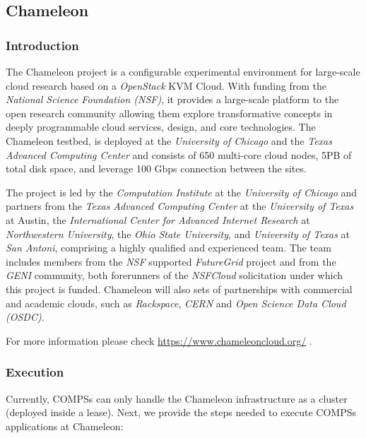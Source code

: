 \clearpage

\subsection{Chameleon}

\subsubsection{Introduction}

The Chameleon project is a configurable experimental environment for large-scale cloud research based on a \textit{OpenStack} 
KVM Cloud. With funding from the \textit{National Science Foundation (NSF)}, it provides a large-scale platform to the open research
community allowing them explore transformative concepts in deeply programmable cloud services, design, and core technologies. The 
Chameleon testbed, is deployed at the \textit{University of Chicago} and the \textit{Texas Advanced Computing Center} and consists of
650 multi-core cloud nodes, 5PB of total disk space, and leverage 100 Gbps connection between the sites. 

The project is led by the \textit{Computation Institute} at the \textit{University of Chicago} and partners from the \textit{Texas 
Advanced Computing Center} at the \textit{University of Texas} at Austin, the \textit{International Center for Advanced Internet 
Research} at \textit{Northwestern University}, the \textit{Ohio State University}, and \textit{University of Texas} at \textit{San
Antoni}, comprising a highly qualified and experienced team. The team includes members from the \textit{NSF} supported 
\textit{FutureGrid} project and from the \textit{GENI} community, both forerunners of the \textit{NSFCloud} solicitation under 
which this project is funded. Chameleon will also sets of partnerships with commercial and academic clouds, such as \textit{Rackspace},
\textit{CERN} and \textit{Open Science Data Cloud (OSDC)}.

For more information please check \url{https://www.chameleoncloud.org/} .

\subsubsection{Execution}

Currently, COMPSs can only handle the Chameleon infrastructure as a cluster (deployed inside a lease). Next, we provide the steps
needed to execute COMPSs applications at Chameleon:

